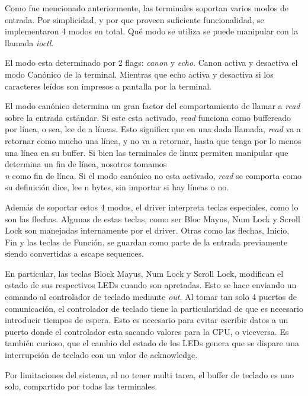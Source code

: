 \documentclass[a4paper,10pt]{article}
\begin{document}
            Como fue mencionado anteriormente, las terminales soportan varios modos de entrada.
            Por simplicidad, y por que proveen suficiente funcionalidad, se implementaron 4 modos en total.
            Qué modo se utiliza se puede manipular con la llamada \textit{ioctl}.

            El modo esta determinado por 2 flags: \textit{canon} y \textit{echo}.
            Canon activa y desactiva el modo Canónico de la terminal.
            Mientras que echo activa y desactiva si los caracteres leídos son impresos a pantalla por la terminal.

            El modo canónico determina un gran factor del comportamiento de llamar a \textit{read} sobre la entrada estándar.
            Si este esta activado, \textit{read} funciona como buffereado por línea, o sea, lee de a líneas.
            Esto significa que en una dada llamada, \textit{read} va a retornar como mucho una línea, y no va a retornar, hasta que tenga por lo menos una línea en su buffer.
            Si bien las terminales de linux permiten manipular que determina un fin de línea, nosotros tomamos \textit{\\n} como fin de línea.
            Si el modo canónico no esta activado, \textit{read} se comporta como su definición dice, lee n bytes, sin importar si hay líneas o no.

            Además de soportar estos 4 modos, el driver interpreta teclas especiales, como lo son las flechas.
            Algunas de estas teclas, como ser Bloc Mayus, Num Lock y Scroll Lock son manejadas internamente por el driver.
            Otras como las flechas, Inicio, Fin y las teclas de Función, se guardan como parte de la entrada previamente siendo convertidas a escape sequences.

            En particular, las teclas Block Mayus, Num Lock y Scroll Lock, modifican el estado de sus respectivos LEDs cuando son apretadas.
            Esto se hace enviando un comando al controlador de teclado mediante \textit{out}. 
            Al tomar tan solo 4 puertos de comunicación, el controlador de teclado tiene la particularidad de que es necesario introducir tiempos de espera.
            Esto es necesario para evitar escribir datos a un puerto donde el controlador esta sacando valores para la CPU, o viceversa.
            Es también curioso, que el cambio del estado de los LEDs genera que se dispare una interrupción de teclado con un valor de acknowledge.

            Por limitaciones del sistema, al no tener multi tarea, el buffer de teclado es uno solo, compartido por todas las terminales.
\end{document}
